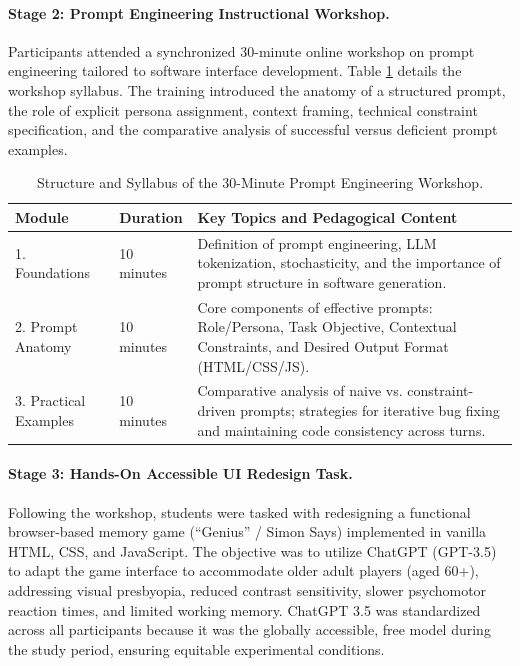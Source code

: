 \documentclass{cleiej}
\begin{document}
\paragraph{Stage 2: Prompt Engineering Instructional Workshop.}
Participants attended a synchronized 30-minute online workshop on prompt engineering tailored to software interface development. Table \ref{tab:workshop_curriculum} details the workshop syllabus. The training introduced the anatomy of a structured prompt, the role of explicit persona assignment, context framing, technical constraint specification, and the comparative analysis of successful versus deficient prompt examples.

\begin{table}[ht]
\centering
\caption{Structure and Syllabus of the 30-Minute Prompt Engineering Workshop.}
\label{tab:workshop_curriculum}
\small
\begin{tabularx}{\columnwidth}{l p{2.0cm} X}
\toprule
\textbf{Module} & \textbf{Duration} & \textbf{Key Topics and Pedagogical Content} \\
\midrule
1. Foundations & 10 minutes & Definition of prompt engineering, LLM tokenization, stochasticity, and the importance of prompt structure in software generation. \\
2. Prompt Anatomy & 10 minutes & Core components of effective prompts: Role/Persona, Task Objective, Contextual Constraints, and Desired Output Format (HTML/CSS/JS). \\
3. Practical Examples & 10 minutes & Comparative analysis of naive vs. constraint-driven prompts; strategies for iterative bug fixing and maintaining code consistency across turns. \\
\bottomrule
\end{tabularx}
\end{table}

\paragraph{Stage 3: Hands-On Accessible UI Redesign Task.}
Following the workshop, students were tasked with redesigning a functional browser-based memory game (``Genius'' / Simon Says) implemented in vanilla HTML, CSS, and JavaScript. The objective was to utilize ChatGPT (GPT-3.5) to adapt the game interface to accommodate older adult players (aged 60+), addressing visual presbyopia, reduced contrast sensitivity, slower psychomotor reaction times, and limited working memory. ChatGPT 3.5 was standardized across all participants because it was the globally accessible, free model during the study period, ensuring equitable experimental conditions. 
\end{document}
